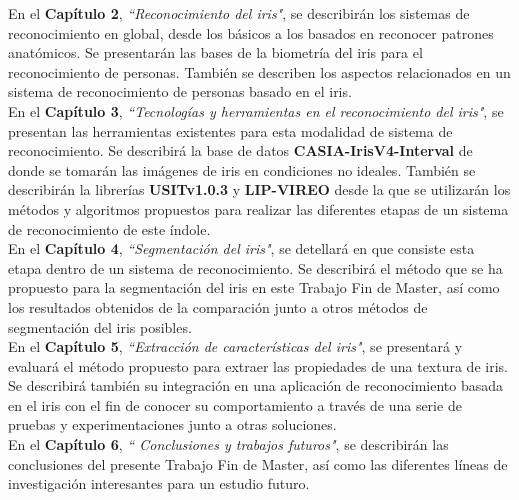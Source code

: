 En el \textbf{Capítulo 2}, \emph{``Reconocimiento del iris"}, se describirán los sistemas de reconocimiento en global, desde los básicos a los basados en reconocer patrones anatómicos. Se presentarán las bases de la biometría del iris para el reconocimiento de personas. También se describen los aspectos relacionados en un sistema de reconocimiento de personas basado en el iris. \\

En el \textbf{Capítulo 3}, \emph{``Tecnologías y herramientas en el reconocimiento del iris"}, se presentan las herramientas existentes para esta modalidad de sistema de reconocimiento. Se describirá la base de datos \textbf{CASIA-IrisV4-Interval} de donde se tomarán las imágenes de iris en condiciones no ideales. También se describirán la librerías \textbf{USITv1.0.3} y \textbf{LIP-VIREO} desde la que se utilizarán los métodos y algoritmos propuestos para realizar las diferentes etapas de un sistema de reconocimiento de este índole. \\

En el \textbf{Capítulo 4}, \emph{``Segmentación del iris"}, se detellará en que consiste esta etapa dentro de un sistema de reconocimiento. Se describirá el método que se ha propuesto para la segmentación del iris en este Trabajo Fin de Master, así como los resultados obtenidos de la comparación junto a otros métodos de segmentación del iris posibles. \\

En el \textbf{Capítulo 5}, \emph{``Extracción de características del iris"}, se presentará y evaluará el método propuesto para extraer las propiedades de una textura de iris. Se describirá también su integración en una aplicación de reconocimiento basada en el iris con el fin de conocer su comportamiento a través de una serie de pruebas y experimentaciones junto a otras soluciones. \\

En el \textbf{Capítulo 6}, \emph{`` Conclusiones y trabajos futuros"}, se describirán las conclusiones del presente Trabajo Fin de Master, así como las diferentes líneas de investigación interesantes para un estudio futuro. \\
